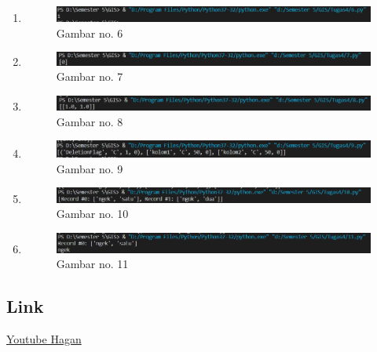 \begin{enumerate}
	\item 
	
	\begin{figure}[H]
		\includegraphics[width=12cm]{figures/1174040/Python2/tampilan6.PNG}
		\centering
		\caption{Gambar no. 6}
	\end{figure}
	
	\item 
	
	\begin{figure}[H]
		\includegraphics[width=12cm]{figures/1174040/Python2/tampilan7.PNG}
		\centering
		\caption{Gambar no. 7}
	\end{figure}
	
	\item 
	
	\begin{figure}[H]
		\includegraphics[width=12cm]{figures/1174040/Python2/tampilan8.PNG}
		\centering
		\caption{Gambar no. 8}
	\end{figure}
	
	\item 
	
	\begin{figure}[H]
		\includegraphics[width=12cm]{figures/1174040/Python2/tampilan9.PNG}
		\centering
		\caption{Gambar no. 9}
	\end{figure}

    \item 
	
	\begin{figure}[H]
		\includegraphics[width=12cm]{figures/1174040/Python2/tampilan10.PNG}
		\centering
		\caption{Gambar no. 10}
	\end{figure}

	\item 
	
	\begin{figure}[H]
		\includegraphics[width=12cm]{figures/1174040/Python2/tampilan11.PNG}
		\centering
		\caption{Gambar no. 11}
	\end{figure}
\end{enumerate}

\subsection{Link}
\href{https://www.youtube.com/watch?v=OFi1jL82r0o}{Youtube Hagan}